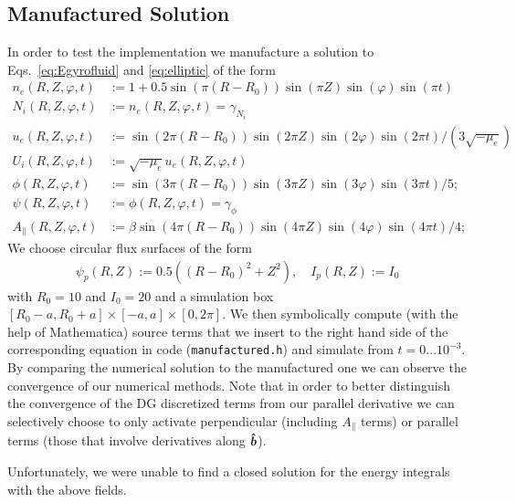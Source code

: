 \subsection{Manufactured Solution}
In order to test the implementation we manufacture a solution to Eqs.~\eqref{eq:Egyrofluid} and \eqref{eq:elliptic} of the form
\begin{align*}
n_e(R,Z,\varphi, t) &:= 1 + 0.5\sin(\pi(R-R_0))\sin(\pi Z)\sin(\varphi)\sin(\pi t) \\
N_i(R,Z,\varphi, t) &:= n_e(R,Z,\varphi,t) = \gamma_{ N_i}  \\
u_e(R,Z,\varphi, t) &:= \sin(2\pi(R-R_0))\sin(2\pi Z)\sin(2\varphi)\sin(2\pi t)/(3\sqrt{-\mu_e}) \\
U_i(R,Z,\varphi, t) &:= \sqrt{-\mu_e}u_e(R,Z,\varphi,t) \\
\phi(R,Z,\varphi,t) &:= \sin(3\pi(R-R_0))\sin(3\pi Z)\sin(3\varphi)\sin(3\pi t)/5; \\
\psi(R,Z,\varphi,t) &:= \phi(R,Z,\varphi, t) = \gamma_{\phi} \\
A_\parallel( R,Z,\varphi,t) &:= \beta\sin(4\pi(R-R_0))\sin(4\pi Z)\sin(4\varphi)\sin(4\pi t)/4;
\end{align*}
We choose circular flux surfaces of the form
\begin{align*}
\psi_p(R,Z) :=0.5((R-R_0)^2 + Z^2),\quad
I_p(R,Z):=I_0
\end{align*}
with $R_0=10$ and $I_0=20$ and a simulation box $[R_0-a,R_0+a]\times[-a,a]\times[0,2\pi]$.
We then symbolically compute (with the help of Mathematica) source terms that we insert to the right hand side of
the corresponding equation in code (\texttt{manufactured.h}) and simulate from $t=0...10^{-3}$.
By comparing the numerical solution to the manufactured one we can observe the convergence of our numerical methods. Note that in order to better distinguish
the convergence of the DG discretized terms from our parallel derivative
we can selectively choose to only activate perpendicular (including $A_\parallel$ terms) or parallel terms (those that involve derivatives along $\bm{\hat{b}}$).

Unfortunately, we were unable to find a closed solution for the energy integrals with the above fields.

